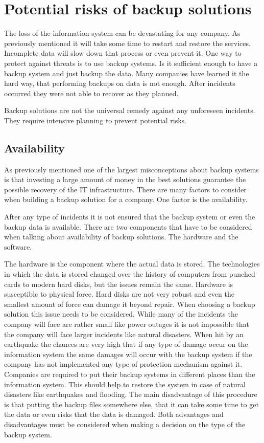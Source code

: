 \section{Potential risks of backup solutions}

The loss of the information system can be devastating for any company.
As previously mentioned it will take some time to restart and restore
the services. Incomplete data will slow down that process or even
prevent it.  One way to protect against threats is to use backup
systems. Is it sufficient enough to have a backup system and just backup
the data. Many companies have learned it the hard way, that performing
backups on data is not enough. After incidents occurred they were not
able to recover as they planned. 

Backup solutions are not the universal remedy against any unforeseen
incidents. They require intensive planning to prevent potential risks. 

\subsection{Availability}

As previously mentioned one of the largest misconceptions about backup
systems is that investing a large amount of money in the best solutions
guarantee the possible recovery of the IT infrastructure. There are many
factors to consider when building a backup solution for a company. One
factor is the availability.

After any type of incidents it is not ensured that the backup system or
even the backup data is available.  There are two components that have
to be considered when talking about availability of backup solutions.
The hardware and the software.

The hardware is the component where the actual data is stored. The
technologies in which the data is stored changed over the history of
computers from punched cards to modern hard disks, but the issues remain
the same. Hardware is susceptible to physical force.  Hard disks are not
very robust and even the smallest amount of force can damage it beyond
repair. When choosing a backup solution this issue needs to be
considered. While many of the incidents the company will face are rather
small like power outages it is not impossible that the company will face
larger incidents like natural disasters. When hit by an earthquake the
chances are very high that if any type of damage occur on the
information system the same damages will occur with the backup system if
the company has not implemented any type of protection mechanism against
it. Companies are required to put their backup systems in different
places than the information system. This should help to restore the
system in case of natural disasters like earthquakes and flooding. The
main disadvantage of this procedure is that putting the backup files
somewhere else, that it can take some time to get the data or even risks
that the data is damaged. Both advantages and disadvantages must be
considered when making a decision on the type of the backup system.

